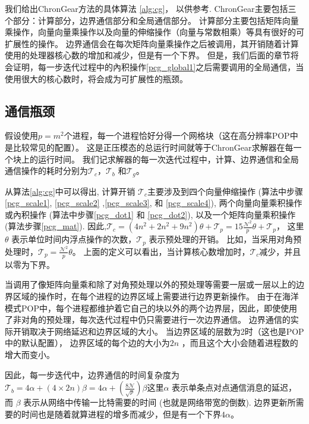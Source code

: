 我们给出ChronGear方法的具体算法
\ref{alg:cg}， 以供参考.  ChronGear主要包括三个部分：计算部分，边界通信部分和全局通信部分。
计算部分主要包括矩阵向量乘操作，向量向量乘操作以及向量的伸缩操作（向量与常数相乘）等具有很好的可扩展性的操作。 
边界通信会在每次矩阵向量乘操作之后被调用，其开销随着计算使用的处理器核心数的增加和减少，但是有一个下界。 
但是，我们后面的章节将会证明，每一步迭代过程中的內积操作\ref{pcg_global1}之后需要调用的全局通信，当使用很大的核心数时，将会成为可扩展性的瓶颈。
 

\subsection{通信瓶颈}
\label{precond:EVP:comm}
  
假设使用$p=m^2$个进程，每一个进程恰好分得一个网格块（这在高分辨率POP中是比较常见的配置）。 
这是正压模态的总运行时间就等于ChronGear求解器在每一个块上的运行时间。 
我们记求解器的每一次迭代过程中，计算、边界通信和全局通信操作的耗时分别为$\mathcal{T}_c$，$\mathcal{T}_b$ 和$\mathcal{T}_g$。 


从算法\ref{alg:cg}中可以得出, 计算开销
$\mathcal{T}_c$主要涉及到四个向量伸缩操作 (算法中步骤\ref{pcg_scale1}, \ref{pcg_scale2} ,\ref{pcg_scale3}, 和
\ref{pcg_scale4}), 两个向量向量乘积操作或內积操作 (算法中步骤\ref{pcg_dot1} 和 \ref{pcg_dot2}), 以及一个矩阵向量乘积操作 (算法步骤\ref{pcg_mat}).  
因此,$\mathcal{T}_c= (4 n^2 +2n^2+ 9n^2)\theta + \mathcal{T}_{p}=15\frac{\mathcal{N}^2}{p}\theta+\mathcal{T}_{p}$，
这里$\theta$ 表示单位时间内浮点操作的次数，$\mathcal{T}_{p}$ 表示预处理的开销。
比如，当采用对角预处理时，$\mathcal{T}_{p} =\frac{\mathcal{N}^2}{p}\theta$。
上面的定义可以看出，当计算核心数增加时，$\mathcal{T}_c$减少，并且以零为下界。

 
当调用了像矩阵向量乘和除了对角预处理以外的预处理等需要一层或一层以上的边界区域的操作时，在每个进程的边界区域上需要进行边界更新操作。 
由于在海洋模式POP中，每个进程都维护着它自己的块以外的两个边界层，因此，即使使用了非对角的预处理，每次迭代过程中仍只需要进行一次边界通信。
边界通信的实际开销取决于网络延迟和边界区域的大小。 当边界区域的层数为2时（这也是POP中的默认配置）， 边界区域的每个边的大小为$2n$ ，而且这个大小会随着进程数的增大而变小。 
 
因此，每一步迭代中，边界通信的时间复杂度为$\mathcal{T}_b =4\alpha +(4\times 2n)\beta=4\alpha +(\frac{8\mathcal{N}}{\sqrt{p}})\beta $这里$\alpha$ 表示单条点对点通信消息的延迟，而
$\beta$ 表示从网络中传输一比特需要的时间 (也就是网络带宽的倒数).
边界更新所需要的时间也是随着就算进程的增多而减少，但是有一个下界$4\alpha$。 


